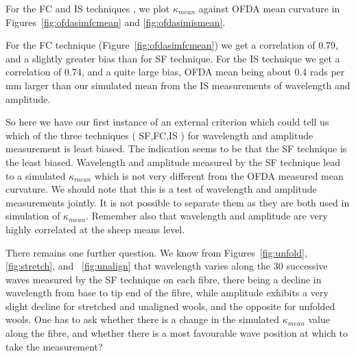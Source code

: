 \documentclass[titlepage,10pt]{article}  %
\begin{document}
For the FC and IS techniques , we plot $\kappa_{mean}$ against OFDA mean curvature in Figures~\ref{fig:ofdasimfcmean} and \ref{fig:ofdasimismean}.


For the FC technique (Figure~\ref{fig:ofdasimfcmean}) we get a correlation of 0.79, and a slightly greater bias than for SF technique. For the IS technique we get a correlation of 0.74, and a quite large bias, OFDA mean being about 0.4 rads per mm larger than our simulated mean from  the IS measurements of wavelength and amplitude. 

So here we have our first instance of an external criterion which could tell us which of the three techniques ( SF,FC,IS ) for wavelength and amplitude measurement is least biased. The indication seems to be that the SF technique is the least biased.  Wavelength and amplitude measured by the SF technique lead to a simulated $\kappa_{mean}$ which is not very different from the OFDA measured mean curvature. We should note that this is a test of wavelength and amplitude measurements jointly. It is not possible to separate them as they are both used in simulation of $\kappa_{mean}$. Remember also that wavelength and amplitude are very highly correlated at the sheep means level.

There remains one further question. We know from Figures~\ref{fig:unfold}, \ref{fig:stretch}, and ~\ref{fig:unalign} that wavelength varies along the 30 successive waves measured by the SF technique on each fibre, there being a decline in wavelength from base to tip end of the fibre, while amplitude exhibits a very slight decline for stretched and unaligned wools, and the opposite for unfolded wools. One has to ask whether there is a change in the simulated $\kappa_{mean}$ value along the fibre, and whether there is a most favourable wave position at which to take the measurement?
\end{document}

